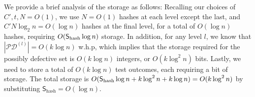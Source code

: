 We provide a brief analysis of the storage as follows: Recalling our choices of $C',t, N=O(1)$, we use $N=O(1)$ hashes at each level except the last, and $C'N\log_2n=O(\log n)$ hashes at the final level, for a total of $O(\log n)$ hashes, requiring $O(\mathsf{S}_{\textup{hash}}\log n)$ storage. In addition, for any level $l$, we know that $|\mathcal{PD}^{(l)}|=O(k\log n)$ w.h.p, which implies that the storage required for the possibly defective set is $O(k\log n)$ integers, or $O(k\log^2n)$ bits. Lastly, we need to store a total of $O(k\log n)$ test outcomes, each requiring a bit of storage. The total storage is $O(\mathsf{S}_{\textup{hash}}\log n+k\log^2n+k\log n)=O(k\log^2n)$ by substituting $\mathsf{S}_{\text{hash}}=O(\log n)$.

